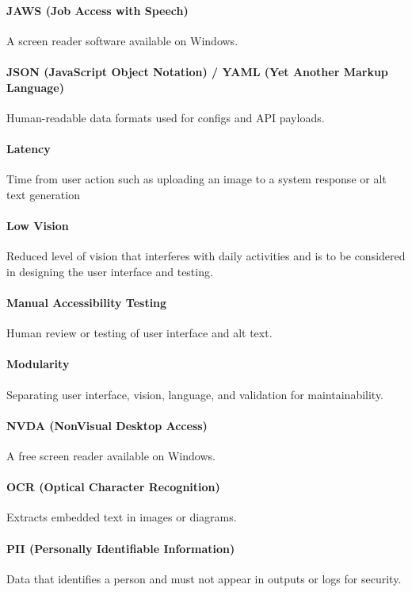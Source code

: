 \documentclass[12pt]{article}
\begin{document}
\paragraph*{JAWS (Job Access with Speech)}
A screen reader software available on Windows.

\paragraph*{JSON (JavaScript Object Notation) / YAML (Yet Another Markup Language)}
Human-readable data formats used for configs and API payloads.

\paragraph*{Latency}
Time from user action such as uploading an image to a system response or alt text generation

\paragraph*{Low Vision}
Reduced level of vision that interferes with daily activities and is to be considered in designing the user interface and testing.

\paragraph*{Manual Accessibility Testing}
Human review or testing of user interface and alt text.

\paragraph*{Modularity}
Separating user interface, vision, language, and validation for maintainability.

\paragraph*{NVDA (NonVisual Desktop Access)}
A free screen reader available on Windows.

\paragraph*{OCR (Optical Character Recognition)}
Extracts embedded text in images or diagrams.

\paragraph*{PII (Personally Identifiable Information)}
Data that identifies a person and must not appear in outputs or logs for security.
\end{document}
